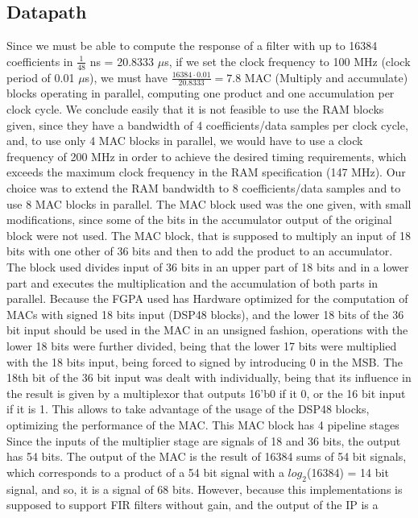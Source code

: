 \documentclass[12pt]{article}
\begin{document}
\subsection{Datapath}
Since we must be able to compute the response of a filter with up to 16384 coefficients in
$\frac{1}{48}$ ns = 20.8333 $\mu$s, if we set the clock frequency to 100 MHz (clock period of 0.01
$\mu$s), we must have $\frac{16384\cdot0.01}{20.8333} = 7.8$ MAC (Multiply and accumulate) blocks
operating in parallel, computing one product and one accumulation per clock cycle. We conclude
easily that it is not feasible to use the RAM blocks given, since they have a bandwidth of 4
coefficients/data samples per clock cycle, and, to use only 4 MAC blocks in parallel, we would have
to use a clock frequency of 200 MHz in order to achieve the desired timing requirements, which
exceeds the maximum clock frequency in the RAM specification (147 MHz). Our choice was to extend the
RAM bandwidth to 8 coefficients/data samples and to use 8 MAC blocks in parallel. The MAC block used
was the one given, with small modifications, since some of the bits in the accumulator output of the
original block were not used. The MAC block, that is supposed to multiply an input of 18 bits with
one other of 36 bits and then to add the product to an accumulator. The block used divides input of
36 bits in an upper part of 18 bits and in a lower part and executes the multiplication and the
accumulation of both parts in parallel. Because the FGPA used has Hardware optimized for the
computation of MACs with signed 18 bits input (DSP48 blocks), and the lower 18 bits of the 36 bit
input should be used in the MAC in an unsigned fashion, operations with the lower 18 bits were
further divided, being that the lower 17 bits were multiplied with the 18 bits input, being forced
to signed by introducing 0 in the MSB. The 18th bit of the 36 bit input was dealt with individually,
being that its influence in the result is given by a multiplexor that outputs 16'b0 if it 0, or the
16 bit input if it is 1. This allows to take advantage of the usage of the DSP48 blocks, optimizing
the performance of the MAC. This MAC block has 4 pipeline stages Since the inputs of the multiplier
stage are signals of 18 and 36 bits, the output has 54 bits. The output of the MAC is the result of
16384 sums of 54 bit signals, which corresponds to a product of a 54 bit signal with a
$log_2$(16384) = 14 bit signal, and so, it is a signal of 68 bits. However, because this
implementations is supposed to support FIR filters without gain, and the output of the IP is a
\end{document}
